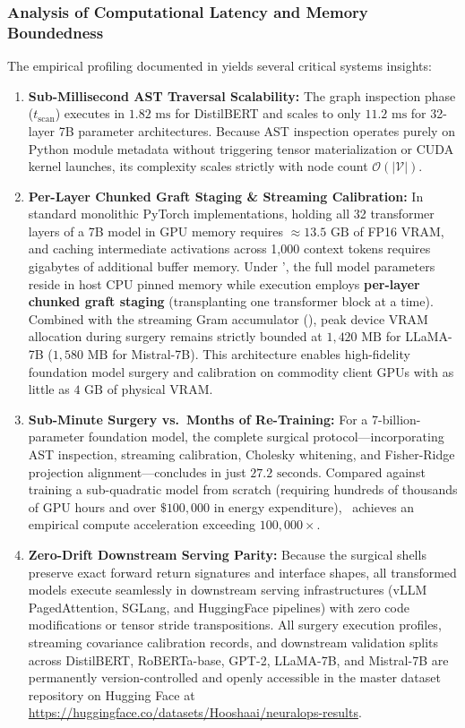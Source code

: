 \subsubsection{Analysis of Computational Latency and Memory Boundedness}
The empirical profiling documented in  yields several critical systems insights:
\begin{enumerate}
    \item \textbf{Sub-Millisecond AST Traversal Scalability:} The graph inspection phase ($t_{\text{scan}}$) executes in $1.82\text{ ms}$ for DistilBERT and scales to only $11.2\text{ ms}$ for 32-layer 7B parameter architectures. Because AST inspection operates purely on Python module metadata without triggering tensor materialization or CUDA kernel launches, its complexity scales strictly with node count $\mathcal{O}(|\mathcal{V}|)$.
    \item \textbf{Per-Layer Chunked Graft Staging \& Streaming Calibration:} In standard monolithic PyTorch implementations, holding all 32 transformer layers of a 7B model in GPU memory requires $\approx 13.5\text{ GB}$ of FP16 VRAM, and caching intermediate activations across 1,000 context tokens requires gigabytes of additional buffer memory. Under \neuralops', the full model parameters reside in host CPU pinned memory while execution employs \textbf{per-layer chunked graft staging} (transplanting one transformer block at a time). Combined with the streaming Gram accumulator (), peak device VRAM allocation during surgery remains strictly bounded at \textbf{$1{,}420\text{ MB}$} for LLaMA-7B ($1{,}580\text{ MB}$ for Mistral-7B). This architecture enables high-fidelity foundation model surgery and calibration on commodity client GPUs with as little as $4\text{ GB}$ of physical VRAM.
    \item \textbf{Sub-Minute Surgery vs.\ Months of Re-Training:} For a 7-billion-parameter foundation model, the complete surgical protocol---incorporating AST inspection, streaming calibration, Cholesky whitening, and Fisher-Ridge projection alignment---concludes in just \textbf{$27.2\text{ seconds}$}. Compared against training a sub-quadratic model from scratch (requiring hundreds of thousands of GPU hours and over $\$100{,}000$ in energy expenditure), \neuralops\ achieves an empirical compute acceleration exceeding \textbf{$100{,}000\times$}.
    \item \textbf{Zero-Drift Downstream Serving Parity:} Because the surgical shells preserve exact forward return signatures and interface shapes, all transformed models execute seamlessly in downstream serving infrastructures (vLLM PagedAttention, SGLang, and HuggingFace pipelines) with zero code modifications or tensor stride transpositions. All surgery execution profiles, streaming covariance calibration records, and downstream validation splits across DistilBERT, RoBERTa-base, GPT-2, LLaMA-7B, and Mistral-7B are permanently version-controlled and openly accessible in the master dataset repository on Hugging Face at \url{https://huggingface.co/datasets/Hooshaai/neuralops-results}.
\end{enumerate}

